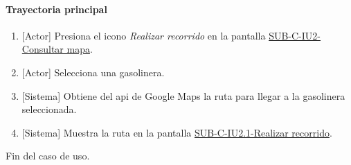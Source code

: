 \paragraph{Trayectoria principal}
	\begin{enumerate}
		\item {[Actor]} Presiona el icono \textit{Realizar recorrido} en la pantalla \hyperref[fig:sub-c-iu2]{SUB-C-IU2-Consultar mapa}.
		\item {[Actor]} Selecciona una gasolinera.
		\item {[Sistema]} Obtiene del api de Google Maps la ruta para llegar a la gasolinera seleccionada.
		\item {[Sistema]} Muestra la ruta en la pantalla \hyperref[fig:sub-c-iu2.1]{SUB-C-IU2.1-Realizar recorrido}.
	\end{enumerate}
	Fin del caso de uso.

